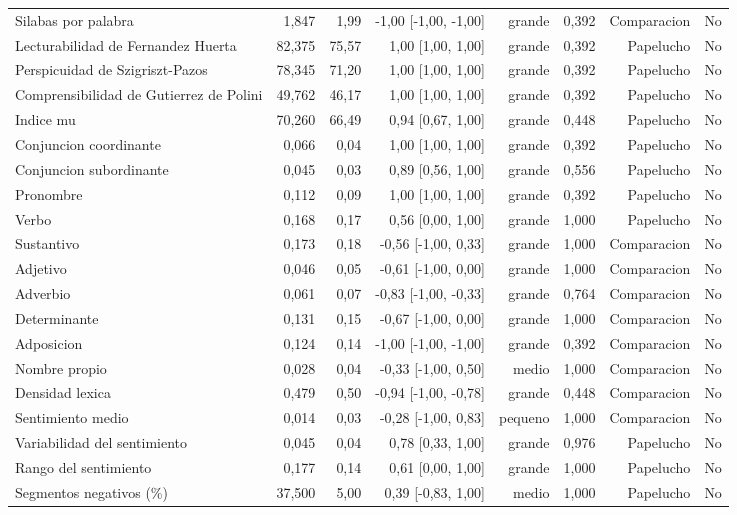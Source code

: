 \begin{table}[htbp]
\begin{tabular}{lrrrrrrr}
Silabas por palabra & 1,847 & 1,99 & -1,00 [-1,00, -1,00] & grande & 0,392 & Comparacion & No \\
Lecturabilidad de Fernandez Huerta & 82,375 & 75,57 & 1,00 [1,00, 1,00] & grande & 0,392 & Papelucho & No \\
Perspicuidad de Szigriszt-Pazos & 78,345 & 71,20 & 1,00 [1,00, 1,00] & grande & 0,392 & Papelucho & No \\
Comprensibilidad de Gutierrez de Polini & 49,762 & 46,17 & 1,00 [1,00, 1,00] & grande & 0,392 & Papelucho & No \\
Indice mu & 70,260 & 66,49 & 0,94 [0,67, 1,00] & grande & 0,448 & Papelucho & No \\
Conjuncion coordinante & 0,066 & 0,04 & 1,00 [1,00, 1,00] & grande & 0,392 & Papelucho & No \\
Conjuncion subordinante & 0,045 & 0,03 & 0,89 [0,56, 1,00] & grande & 0,556 & Papelucho & No \\
Pronombre & 0,112 & 0,09 & 1,00 [1,00, 1,00] & grande & 0,392 & Papelucho & No \\
Verbo & 0,168 & 0,17 & 0,56 [0,00, 1,00] & grande & 1,000 & Papelucho & No \\
Sustantivo & 0,173 & 0,18 & -0,56 [-1,00, 0,33] & grande & 1,000 & Comparacion & No \\
Adjetivo & 0,046 & 0,05 & -0,61 [-1,00, 0,00] & grande & 1,000 & Comparacion & No \\
Adverbio & 0,061 & 0,07 & -0,83 [-1,00, -0,33] & grande & 0,764 & Comparacion & No \\
Determinante & 0,131 & 0,15 & -0,67 [-1,00, 0,00] & grande & 1,000 & Comparacion & No \\
Adposicion & 0,124 & 0,14 & -1,00 [-1,00, -1,00] & grande & 0,392 & Comparacion & No \\
Nombre propio & 0,028 & 0,04 & -0,33 [-1,00, 0,50] & medio & 1,000 & Comparacion & No \\
Densidad lexica & 0,479 & 0,50 & -0,94 [-1,00, -0,78] & grande & 0,448 & Comparacion & No \\
Sentimiento medio & 0,014 & 0,03 & -0,28 [-1,00, 0,83] & pequeno & 1,000 & Comparacion & No \\
Variabilidad del sentimiento & 0,045 & 0,04 & 0,78 [0,33, 1,00] & grande & 0,976 & Papelucho & No \\
Rango del sentimiento & 0,177 & 0,14 & 0,61 [0,00, 1,00] & grande & 1,000 & Papelucho & No \\
Segmentos negativos (\%) & 37,500 & 5,00 & 0,39 [-0,83, 1,00] & medio & 1,000 & Papelucho & No \\

\end{tabular}
\end{table}
